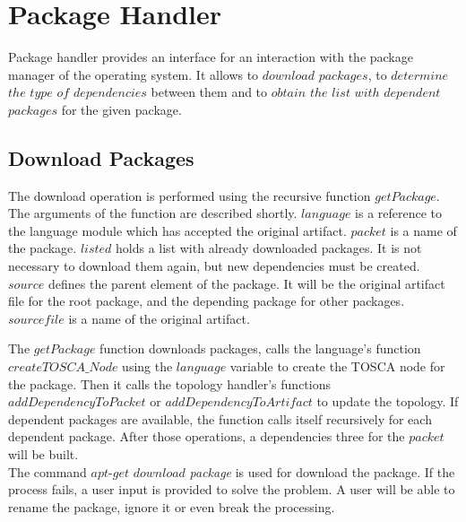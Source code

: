 \section{Package Handler}
Package handler provides an interface for an interaction with the package manager of the operating system.
It allows to $download$ $packages$, to $determine$ $the$ $type$ $of$ $dependencies$ between them and to $obtain$ $the$ $list$ $with$ $dependent$ $packages$ for the given package.

\subsection*{Download Packages}
The download operation is performed using the recursive function $getPackage$. 
The arguments of the function are described shortly.
$language$ is a reference to the language module which has accepted the original artifact.
$packet$ is a name of the package.
$listed$ holds a list with already downloaded packages.
It is not necessary to download them again, but new dependencies must be created.
$source$ defines the parent element of the package. 
It will be the original artifact file for the root package, and the depending package for other packages.
$sourcefile$ is a name of the original artifact.

The $getPackage$ function downloads packages, calls the language's function $createTOSCA\_Node$ using the $language$ variable to create the TOSCA node for the package.
Then it calls the topology handler's functions $addDependencyToPacket$ or $addDependencyToArtifact$ to update the topology. 
If dependent packages are available, the function calls itself recursively for each dependent package.
After those operations, a dependencies three for the $packet$ will be built.\\
The command $apt$-$get$ $download$ \emph{package} is used for download the package. 
If the process fails, a user input is provided to solve the problem. 
A user will be able to rename the package, ignore it or even break the processing.

